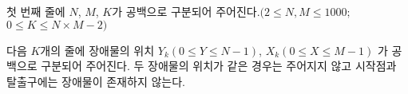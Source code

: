 첫 번째 줄에 $N$, $M$, $K$가 공백으로 구분되어 주어진다.$(2 ≤ N, M ≤ 1000;$ $0 ≤ K ≤ N×M-2)$

다음 $K$개의 줄에 장애물의 위치 $Y_k$$(0 ≤ Y ≤ N-1)$, $X_k$$(0 ≤ X ≤ M-1)$ 가 공백으로 구분되어 주어진다. 두 장애물의 위치가 같은 경우는 주어지지 않고 시작점과 탈출구에는 장애물이 존재하지 않는다.
